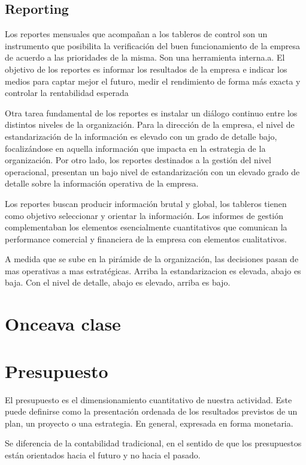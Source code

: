 \documentclass[titlepage,a4paper]{article}
\begin{document}
\subsection{Reporting}
Los reportes mensuales que acompañan a los tableros de control son un instrumento que posibilita la
verificación del buen funcionamiento de la empresa de acuerdo a las prioridades de la misma. Son una herramienta interna.a. El objetivo de los reportes es informar los resultados de la empresa e indicar los medios para captar mejor el futuro, medir el rendimiento de forma más exacta y controlar la rentabilidad esperada

Otra tarea fundamental de los reportes es instalar un diálogo continuo entre los distintos niveles de la
organización. Para la dirección de la empresa, el nivel de estandarización de la información es elevado con
un grado de detalle bajo, focalizándose en aquella información que impacta en la estrategia de la
organización. Por otro lado, los reportes destinados a la gestión del nivel operacional, presentan un bajo
nivel de estandarización con un elevado grado de detalle sobre la información operativa de la empresa.

Los reportes buscan producir información brutal y global, los tableros tienen como objetivo
seleccionar y orientar la información. Los informes de gestión complementaban los
elementos esencialmente cuantitativos que comunican la performance comercial y
financiera de la empresa con elementos cualitativos.

A medida que se sube en la pirámide de la organización, las decisiones pasan de mas operativas a mas estratégicas. Arriba la estandarizacion es elevada, abajo es baja. Con el nivel de detalle, abajo es elevado, arriba es bajo.

\section*{Onceava clase}
\section{Presupuesto}

El presupuesto es el dimensionamiento cuantitativo de nuestra actividad. Este puede definirse como la presentación ordenada de los resultados previstos de un plan, un proyecto o una estrategia. En general, expresada en forma monetaria.

Se diferencia de la contabilidad tradicional, en el sentido de
que los presupuestos están orientados hacia el futuro y no hacia
el pasado.
\end{document}
